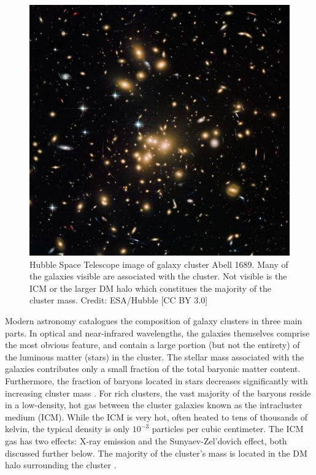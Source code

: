 \begin{figure}[!ht]
	\begin{center}
		\includegraphics[height=0.5\textheight]{figures/abell1689_hubble.pdf} 
	\end{center}
	\caption[Hubble Space Telescope image of galaxy cluster Abell 1689.]{Hubble Space Telescope image of galaxy cluster Abell 1689. Many of the galaxies visible are associated with the cluster. Not visible is the ICM or the larger DM halo which constitues the majority of the cluster mass. Credit: ESA/Hubble [CC BY 3.0]}
	\label{fig: abell1689_hubble} 
\end{figure}

Modern astronomy catalogues the composition of galaxy clusters in three main parts. In optical and near-infrared wavelengths, the galaxies themselves comprise the most obvious feature, and contain a large portion (but not the entirety) of the luminous matter (stars) in the cluster. The stellar mass associated with the galaxies contributes only a small fraction of the total baryonic matter content. Furthermore, the fraction of baryons located in stars decreases significantly with increasing cluster mass \citep{Gonzalez2007}. For rich clusters, the vast majority of the baryons reside in a low-density, hot gas between the cluster galaxies known as the intracluster medium (ICM). While the ICM is very hot, often heated to tens of thousands of kelvin, the typical density is only $10^{-3}$ particles per cubic centimeter. The ICM gas has two effects: X-ray emission and the Sunyaev-Zel'dovich effect, both discussed further below. The majority of the cluster's mass is located in the DM halo surrounding the cluster . 

